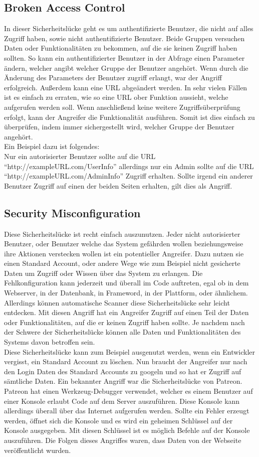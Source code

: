 \subsection{Broken Access Control}
In dieser Sicherheitslücke geht es um authentifizierte Benutzer, die nicht auf alles Zugriff haben, sowie nicht authentifizierte Benutzer. Beide Gruppen versuchen Daten oder Funktionalitäten zu bekommen, auf die sie keinen Zugriff haben sollten. So kann ein authentifizierter Benutzer in der Abfrage einen Parameter ändern, welcher angibt welcher Gruppe der Benutzer angehört. Wenn durch die Änderung des Parameters der Benutzer zugriff erlangt, war der Angriff erfolgreich. Außerdem kann eine URL abgeändert werden. In sehr vielen Fällen ist es einfach zu erraten, wie so eine URL ober Funktion aussieht, welche aufgerufen werden soll. Wenn anschließend keine weitere Zugriffsüberprüfung erfolgt, kann der Angreifer die Funktionalität ausführen. Somit ist dies einfach zu überprüfen, indem immer sichergestellt wird, welcher Gruppe der Benutzer angehört. \\
Ein Beispiel dazu ist folgendes: \\
Nur ein autorisierter Benutzer sollte auf die URL \enquote{http://exampleURL.com/UserInfo} allerdings nur ein Admin sollte auf die URL \enquote{http://exampleURL.com/AdminInfo} Zugriff erhalten. Sollte irgend ein anderer Benutzer Zugriff auf einen der beiden Seiten erhalten, gilt dies als Angriff. 
\subsection{Security Misconfiguration}
Diese Sicherheitslücke ist recht einfach auszunutzen. Jeder nicht autorisierter Benutzer, oder Benutzer welche das System gefährden wollen beziehungsweise ihre Aktionen verstecken wollen ist ein potentieller Angreifer. Dazu nutzen sie einen Standard Account, oder andere Wege wie zum Beispiel nicht gesicherte Daten um Zugriff oder Wissen über das System zu erlangen. Die Fehlkonfiguration kann jederzeit und überall im Code auftreten, egal ob in dem Webserver, in der Datenbank, in Frameword, in der Plattform, oder ähnlichem. Allerdings können automatische Scanner diese Sicherheitslücke sehr leicht entdecken. Mit diesen Angriff hat ein Angreifer Zugriff auf einen Teil der Daten oder Funktionalitäten, auf die er keinen Zugriff haben sollte. Je nachdem nach der Schwere der Sicherheitslücke können alle Daten und Funktionalitäten des Systems davon betroffen sein. \\
Diese Sicherheitslücke kann zum Beispiel ausgenutzt werden, wenn ein Entwickler vergisst, ein Standard Account zu löschen. Nun braucht der Angreifer nur nach den Login Daten des Standard Accounts zu googeln und so hat er Zugriff auf sämtliche Daten. Ein bekannter Angriff war die Sicherheitslücke von Patreon. Patreon hat einen Werkzeug-Debugger verwendet, welcher es einem Benutzer auf einer Konsole erlaubt Code auf dem Server auszuführen. Diese Konsole kann allerdings überall über das Internet aufgerufen werden. Sollte ein Fehler erzeugt werden, öffnet sich die Konsole und es wird ein geheimen Schlüssel auf der Konsole ausgegeben. Mit diesen Schlüssel ist es möglich Befehle auf der Konsole auszuführen. Die Folgen dieses Angriffes waren, dass Daten von der Webseite veröffentlicht wurden.
